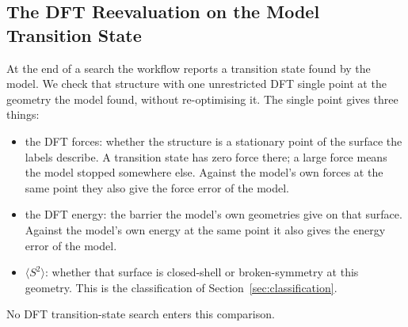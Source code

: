 \subsection{The DFT Reevaluation on the Model Transition State}
\label{sec:dft}

At the end of a search the workflow reports a transition state found
by the model. We check that structure with one unrestricted DFT
single point at the geometry the model found, without re-optimising
it. The single point gives three things:

\begin{itemize}
  \item the DFT forces: whether the structure is a stationary point
    of the surface the labels describe. A transition state has zero
    force there; a large force means the model stopped somewhere
    else. Against the model's own forces at the same point they also
    give the force error of the model.
  \item the DFT energy: the barrier the model's own geometries give on
    that surface. Against the model's own energy at the same point it
    also gives the energy error of the model.
  \item $\langle S^2\rangle$: whether that surface is closed-shell or
    broken-symmetry at this geometry. This is the classification of
    Section~\ref{sec:classification}.
\end{itemize}

No DFT transition-state search enters this comparison.

